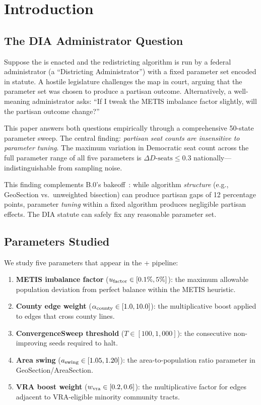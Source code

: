 \section{Introduction}
\label{sec:introduction}

\subsection{The DIA Administrator Question}

Suppose the \dia{} is enacted and the redistricting algorithm is run by
a federal administrator (a ``Districting Administrator'') with a fixed
parameter set encoded in statute.
A hostile legislature challenges the map in court, arguing that the
parameter set was chosen to produce a partisan outcome.
Alternatively, a well-meaning administrator asks: ``If I tweak the
METIS imbalance factor slightly, will the partisan outcome change?''

This paper answers both questions empirically through a comprehensive
50-state parameter sweep.
The central finding: \emph{partisan seat counts are insensitive to
parameter tuning}.
The maximum variation in Democratic seat count across the full parameter
range of all five parameters is $\Delta D\text{-seats} \leq 0.3$ nationally---
indistinguishable from sampling noise.

This finding complements B.0's bakeoff~\citep{b0paper}: while algorithm
\emph{structure} (e.g., GeoSection vs.\ unweighted bisection) can produce
partisan gaps of 12 percentage points, parameter \emph{tuning} within a
fixed algorithm produces negligible partisan effects.
The DIA statute can safely fix any reasonable parameter set.

\subsection{Parameters Studied}

We study five parameters that appear in the \ar{} + \cs{} pipeline:

\begin{enumerate}
\item \textbf{METIS imbalance factor} ($u_{\mathrm{factor}} \in [0.1\%, 5\%]$):
      the maximum allowable population deviation from perfect balance
      within the METIS heuristic.
\item \textbf{County edge weight} ($\alpha_{\mathrm{county}} \in [1.0, 10.0]$):
      the multiplicative boost applied to edges that cross county lines.
\item \textbf{ConvergenceSweep threshold} ($T \in [100, 1{,}000]$):
      the consecutive non-improving seeds required to halt.
\item \textbf{Area swing} ($a_{\mathrm{swing}} \in [1.05, 1.20]$):
      the area-to-population ratio parameter in GeoSection/AreaSection.
\item \textbf{VRA boost weight} ($w_{\mathrm{vra}} \in [0.2, 0.6]$):
      the multiplicative factor for edges adjacent to VRA-eligible
      minority community tracts.
\end{enumerate}

